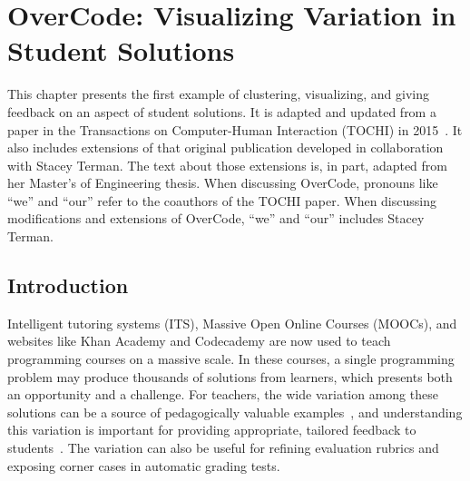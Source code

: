 \chapter{OverCode: Visualizing Variation in Student Solutions}\label{chapter:overcode}


This chapter presents the first example of clustering, visualizing, and giving feedback on an aspect of student solutions. It is adapted and updated  from a paper in the Transactions on Computer-Human Interaction (TOCHI) in 2015~\cite{overcode}. It also includes extensions of that original publication developed in collaboration with Stacey Terman. The text about those extensions is, in part, adapted from her Master's of Engineering thesis. When discussing OverCode, pronouns like ``we'' and ``our'' refer to the coauthors of the TOCHI paper. When discussing modifications and extensions of OverCode, ``we'' and ``our'' includes Stacey Terman.

\section{Introduction}

Intelligent tutoring systems (ITS), Massive Open Online Courses (MOOCs), and websites like Khan Academy and Codecademy are now used to teach programming courses on a massive scale. In these courses, a single programming problem may produce thousands of solutions from learners, which presents both an opportunity and a challenge. For teachers, the wide variation among these solutions can be a source of pedagogically valuable examples~\cite{marton13}, and understanding this variation is important for providing appropriate, tailored feedback to students~\cite{basupowergrading,MOOCshop}. The variation can also be useful for refining evaluation rubrics and exposing corner cases in automatic grading tests.

